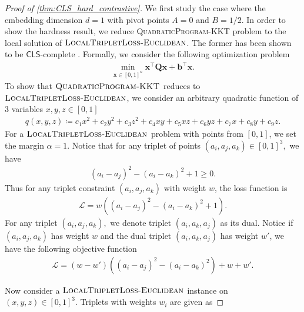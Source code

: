 \documentclass{article}
\theoremstyle{definition}  %
\theoremstyle{plain}
\numberwithin{observation}{section}
\numberwithin{claim}{section}
\numberwithin{fact}{section}
\numberwithin{lemma}{section}
\numberwithin{proposition}{section}
\numberwithin{theorem}{section}
\numberwithin{corollary}{section}
\numberwithin{definition}{section}
\def\vb{{\bm{b}}}
\def\vx{{\bm{x}}}
\newcommand{\mat}[1]{\mathbf{#1}}
\newcommand{\defeq}{\coloneqq}
\newcommand{\CLS}{\mathsf{CLS}}
\newcommand{\Contrastive}{\textsc{LocalTripletLoss-Euclidean}}
\newcommand{\QuadraticKKT}{\textsc{QuadraticProgram-KKT}}
\theoremstyle{plain}
\begin{document}
    \begin{proof}[Proof of \cref{thm:CLS_hard_contrastive}]
    We first study the case where the embedding dimension $d = 1$ with pivot points $A = 0$ and $B = 1/2$. In order to show the hardness result, we reduce \textsc{QuadraticProgram-KKT} problem to the local solution of $\Contrastive$. The former has been shown to be $\CLS$-complete \citep{fearnley2024complexity}. Formally, we consider the following optimization problem
    \begin{align} \label{eq:quadratic_program}
        \min_{\vx \in [0, 1]^n} \vx^\top \mat{Q} \vx + \vb^\top \vx.
    \end{align}
To show that $\QuadraticKKT$ reduces to $\Contrastive$, we consider an arbitrary quadratic function of $3$ variables $x, y, z \in [0, 1]$
\begin{align} \label{eq:quadratic_poly}
    q(x, y, z) \defeq c_1 x^2 + c_2 y^2 + c_3 z^2 + c_4 xy + c_5 xz + c_6 yz + c_7 x + c_8 y + c_9 z. 
\end{align}
For a $\Contrastive$ problem with points from $[0, 1]$, we set the margin $\alpha = 1$. Notice that for any triplet of points $(a_i, a_j, a_k) \in [0, 1]^3, $ we have 
\begin{align*}
    (a_i - a_j)^2 - (a_i - a_k)^2 + 1 \geq 0.
\end{align*}
Thus for any triplet constraint $(a_i, a_j, a_k)$ with weight $w$, the loss function is  
\begin{align*}
    \mathcal{L} = w \left((a_i - a_j)^2 - (a_i - a_k)^2 + 1\right).
\end{align*}
For any triplet $(a_i, a_j, a_k),$ we denote triplet $(a_i, a_k, a_j)$ as its dual. Notice if $(a_i, a_j, a_k)$ has weight $w$ and the dual triplet $(a_i, a_k, a_j)$ has weight $w'$, we have the following objective function
\begin{align*}
    \mathcal{L} = (w - w')\left((a_i - a_j)^2 - (a_i - a_k)^2\right) + w + w'.
\end{align*}

Now consider a $\Contrastive$ instance on $(x, y, z) \in [0, 1]^3$. Triplets with weights $w_i$ are given as


\end{proof}
\end{document}
